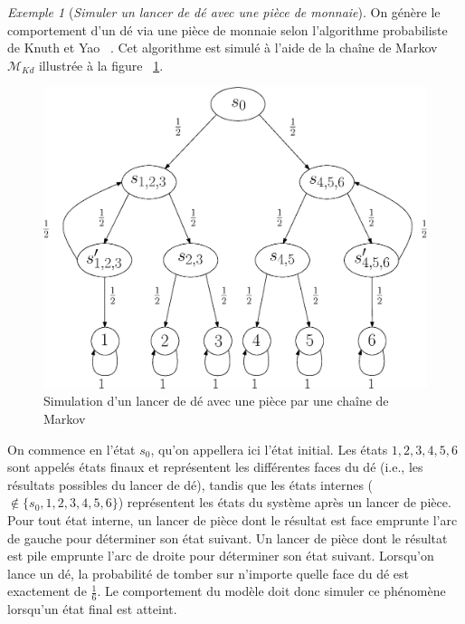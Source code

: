 \documentclass[12pt,a4paper]{report}
\theoremstyle{definition}%
\theoremstyle{remark}
\newtheorem{example}{Exemple}[chapter]
\newcommand{\ie}{i.e., }
\begin{document}
\begin{example} [\textit{Simuler un lancer de dé avec une pièce de monnaie}] \label{knuthdie}
	On génère le comportement d'un dé via une pièce de monnaie selon l'algorithme probabiliste de Knuth et Yao ~\cite{KY76}. Cet algorithme est simulé à l'aide de la chaîne de Markov $\mathcal{M}_{Kd}$ illustrée à la figure ~\ref{diebyacoin}.
	\begin{figure}[H]
		\centering
		\includegraphics[scale=0.5]{figures/dieByaCoin.eps}
		\caption{Simulation d'un lancer de dé avec une pièce par une chaîne de Markov}
		\label{diebyacoin}
	\end{figure}
	On commence en l'état $s_0$, qu'on appellera ici l'état initial. Les états $1, 2, 3, 4, 5, 6$ sont appelés états finaux et représentent les différentes faces du dé (\ie les résultats possibles du lancer de dé), tandis que les états internes ($\notin \{s_0, 1, 2, 3, 4, 5, 6\}$) représentent les états du système après un lancer de pièce.
	 Pour tout état interne, un lancer de pièce dont le résultat est face emprunte l'arc de gauche pour déterminer son état suivant. Un lancer de pièce dont le résultat est pile emprunte l'arc de droite pour déterminer son état suivant. Lorsqu'on lance un dé, la probabilité de tomber sur n'importe quelle face du dé est exactement de $\frac{1}{6}$. Le comportement du modèle doit donc simuler ce phénomène lorsqu'un état final est atteint.\\
	

\end{example}
\end{document}
